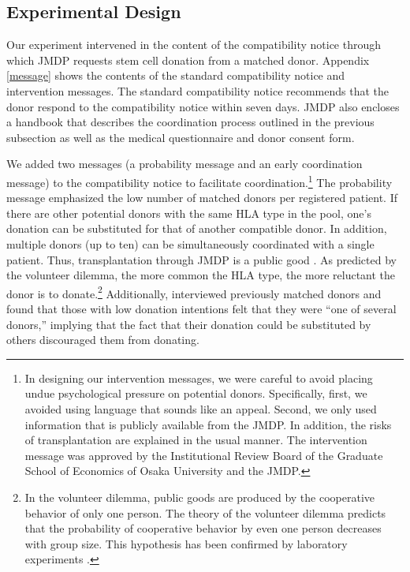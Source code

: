 \documentclass[12pt, a4paper]{article}
\begin{document}
\hypertarget{design}{%
\subsection{Experimental Design}\label{design}}

Our experiment intervened in the content of the compatibility notice through which JMDP requests stem cell donation from a matched donor. Appendix \ref{message} shows the contents of the standard compatibility notice and intervention messages. The standard compatibility notice recommends that the donor respond to the compatibility notice within seven days. JMDP also encloses a handbook that describes the coordination process outlined in the previous subsection as well as the medical questionnaire and donor consent form.

We added two messages (a probability message and an early coordination message) to the compatibility notice to facilitate coordination.\footnote{In designing our intervention messages, we were careful to avoid placing undue psychological pressure on potential donors. Specifically, first, we avoided using language that sounds like an appeal. Second, we only used information that is publicly available from the JMDP. In addition, the risks of transplantation are explained in the usual manner. The intervention message was approved by the Institutional Review Board of the Graduate School of Economics of Osaka University and the JMDP.} The probability message emphasized the low number of matched donors per registered patient. If there are other potential donors with the same HLA type in the pool, one's donation can be substituted for that of another compatible donor. In addition, multiple donors (up to ten) can be simultaneously coordinated with a single patient. Thus, transplantation through JMDP is a public good \citep{Bergstrom2009}. As predicted by the volunteer dilemma, the more common the HLA type, the more reluctant the donor is to donate.\footnote{In the volunteer dilemma, public goods are produced by the cooperative behavior of only one person. The theory of the volunteer dilemma predicts that the probability of cooperative behavior by even one person decreases with group size. This hypothesis has been confirmed by laboratory experiments \citep{Diekmann1985, Diekmann1986, Franzen1999, Davis2017}.} Additionally, \citet{Kurosawa2022} interviewed previously matched donors and found that those with low donation intentions felt that they were ``one of several donors,'' implying that the fact that their donation could be substituted by others discouraged them from donating.
\end{document}
